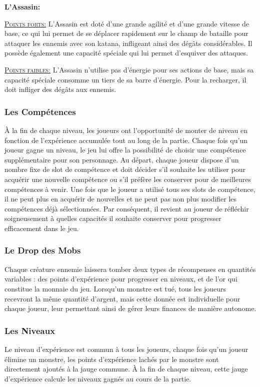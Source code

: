 \documentclass{article}
\begin{document}
\textbf{L'Assasin:}
\begin{list}{}{\leftmargin 1cm} 
\item \textsc{\underline{Points forts:}}
L'Assasin est doté d'une grande agilité et d'une grande vitesse de base, ce qui lui permet de se déplacer rapidement sur le champ de bataille pour attaquer les ennemis avec son katana, infligeant ainsi des dégâts considérables. Il possède également une capacité spéciale qui lui permet d'esquiver des attaques.
\item \textsc{\underline{Points faibles:}}
L'Assasin n'utilise pas d'énergie pour ses actions de base, mais sa capacité spéciale consomme un tiers de sa barre d'énergie. Pour la recharger, il doit infliger des dégâts aux ennemis.
\end{list}

\subsubsection{Les Compétences}
À la fin de chaque niveau, les joueurs ont l'opportunité de monter de niveau en fonction de l'expérience accumulée tout au long de la partie. Chaque fois qu'un joueur gagne un niveau, le jeu lui offre la possibilité de choisir une compétence supplémentaire pour son personnage. Au départ, chaque joueur dispose d'un nombre fixe de slot de compétence et doit décider s'il souhaite les utiliser pour acquérir une nouvelle compétence ou s'il préfère les conserver pour de meilleures compétences à venir. Une fois que le joueur a utilisé tous ses slots de compétence, il ne peut plus en acquérir de nouvelles et ne peut pas non plus modifier les compétences déjà sélectionnées. Par conséquent, il revient au joueur de réfléchir soigneusement à quelles capacités il souhaite conserver pour progresser efficacement dans le jeu. 
\subsubsection{Le Drop des Mobs}
Chaque créature ennemie laissera tomber deux types de récompenses en quantités variables : des points d'expérience pour progresser en niveaux, et de l'or qui constitue la monnaie du jeu. Lorsqu'un monstre est tué, tous les joueurs recevront la même quantité d'argent, mais cette donnée est individuelle pour chaque joueur, leur permettant ainsi de gérer leurs finances de manière autonome.
\subsubsection{Les Niveaux}
Le niveau d'expérience est commun à tous les joueurs, chaque fois qu'un joueur élimine un monstre, les points d'expérience lachés par le monstre sont directement ajoutés à la jauge commune. À la fin de chaque niveau, cette jauge d'expérience calcule les niveaux gagnés au cours de la partie.
\end{document}
